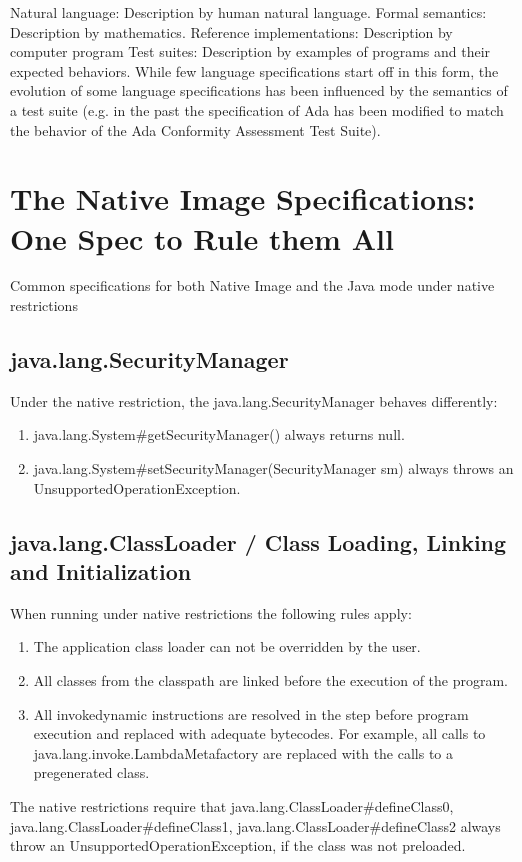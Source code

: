    Natural language: Description by human natural language.
    Formal semantics: Description by mathematics.
    Reference implementations: Description by computer program
    Test suites: Description by examples of programs and their expected behaviors. While few language specifications start off in this form, the evolution of some language specifications has been influenced by the semantics of a test suite (e.g. in the past the specification of Ada has been modified to match the behavior of the Ada Conformity Assessment Test Suite).

    
\chapter{The Native Image Specifications: One Spec to Rule them All}
Common specifications for both Native Image and the Java mode under native restrictions
\section{java.lang.SecurityManager}
Under the native restriction, the java.lang.SecurityManager behaves differently:
\begin{enumerate}
    \item java.lang.System\#getSecurityManager() always returns null.
    \item java.lang.System\#setSecurityManager(SecurityManager sm) always throws an UnsupportedOperationException. 
\end{enumerate}
\section{java.lang.ClassLoader / Class Loading, Linking and Initialization}
When running under native restrictions the following rules apply:
\begin{enumerate}
    \item The application class loader can not be overridden by the user.
    \item All classes from the classpath are linked before the execution of the program.
    \item All invokedynamic instructions are resolved in the step before program execution and replaced with adequate bytecodes. For example, all calls to java.lang.invoke.LambdaMetafactory are replaced with the calls to a pregenerated class.
\end{enumerate}

The native restrictions require that java.lang.ClassLoader\#defineClass0, java.lang.ClassLoader\#defineClass1, java.lang.ClassLoader\#defineClass2 always throw an UnsupportedOperationException, if the class was not preloaded. 

